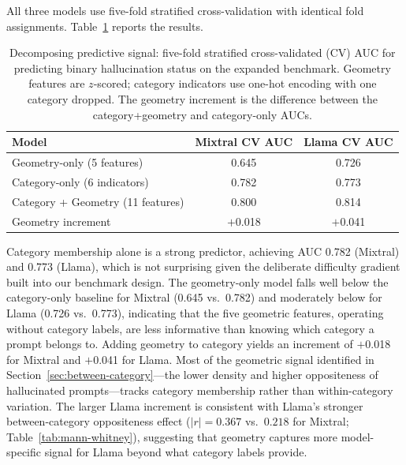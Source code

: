 \noindent All three models use five-fold stratified cross-validation with identical fold assignments. Table~\ref{tab:decomposition} reports the results.

\begin{table}[ht]
\centering
\begin{tabular}{lcc}
\toprule
\textbf{Model} & \textbf{Mixtral CV AUC} & \textbf{Llama CV AUC} \\
\midrule
Geometry-only (5 features)          & 0.645 & 0.726 \\
Category-only (6 indicators)        & 0.782 & 0.773 \\
Category + Geometry (11 features)   & 0.800 & 0.814 \\
\midrule
Geometry increment                  & $+$0.018 & $+$0.041 \\
\bottomrule
\end{tabular}
\caption{Decomposing predictive signal: five-fold stratified cross-validated (CV) AUC for predicting binary hallucination status on the expanded benchmark. Geometry features are $z$-scored; category indicators use one-hot encoding with one category dropped. The geometry increment is the difference between the category+geometry and category-only AUCs.}
\label{tab:decomposition}
\end{table}

Category membership alone is a strong predictor, achieving AUC 0.782 (Mixtral) and 0.773 (Llama), which is not surprising given the deliberate difficulty gradient built into our benchmark design. The geometry-only model falls well below the category-only baseline for Mixtral (0.645 vs.\ 0.782) and moderately below for Llama (0.726 vs.\ 0.773), indicating that the five geometric features, operating without category labels, are less informative than knowing which category a prompt belongs to. Adding geometry to category yields an increment of $+$0.018 for Mixtral and $+$0.041 for Llama. Most of the geometric signal identified in Section~\ref{sec:between-category}---the lower density and higher oppositeness of hallucinated prompts---tracks category membership rather than within-category variation. The larger Llama increment is consistent with Llama's stronger between-category oppositeness effect ($|r| = 0.367$ vs.\ $0.218$ for Mixtral; Table~\ref{tab:mann-whitney}), suggesting that geometry captures more model-specific signal for Llama beyond what category labels provide.


